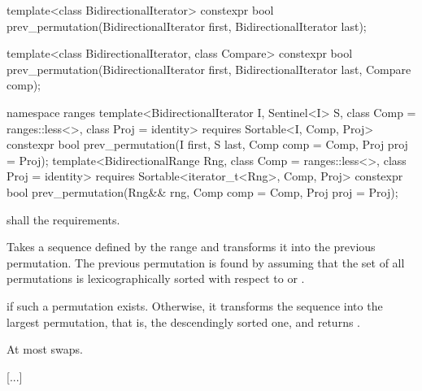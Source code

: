%
\begin{itemdecl}
template<class BidirectionalIterator>
  constexpr bool prev_permutation(BidirectionalIterator first,
                                  BidirectionalIterator last);

template<class BidirectionalIterator, class Compare>
  constexpr bool prev_permutation(BidirectionalIterator first,
                                  BidirectionalIterator last, Compare comp);
\end{itemdecl}
\begin{addedblock}
\begin{itemdecl}
namespace ranges {
  template<BidirectionalIterator I, Sentinel<I> S, class Comp = ranges::less<>,
      class Proj = identity>
    requires Sortable<I, Comp, Proj>
    constexpr bool
      prev_permutation(I first, S last, Comp comp = Comp{}, Proj proj = Proj{});
  template<BidirectionalRange Rng, class Comp = ranges::less<>,
      class Proj = identity>
    requires Sortable<iterator_t<Rng>, Comp, Proj>
    constexpr bool
      prev_permutation(Rng&& rng, Comp comp = Comp{}, Proj proj = Proj{});
}
\end{itemdecl}
\end{addedblock}

\begin{itemdescr}
\pnum
\requires
{}
 shall  the
 requirements.

\pnum
\effects
Takes a sequence defined by the range
and transforms it into the previous permutation.
The previous permutation is found by assuming that the set of all permutations is
lexicographically sorted with respect to
or  .

\pnum
\returns
{}
if such a permutation exists.
Otherwise, it transforms the sequence into the largest permutation,
that is, the descendingly sorted one, and returns
.

\pnum
\complexity
At most
swaps.
\end{itemdescr}

[...]
